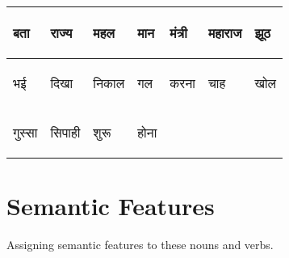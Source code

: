 \documentclass{article}
\begin{document}
\begin{table}[h]
\begin{tabular}{|l|l|l|l|l|l|l|}
\begin{hindi} बता \end{hindi} & \begin{hindi} राज्य \end{hindi} & \begin{hindi} महल \end{hindi} & \begin{hindi} मान \end{hindi} & \begin{hindi} मंत्री \end{hindi} & \begin{hindi} महाराज \end{hindi} & \begin{hindi} झूठ \end{hindi} \\ \hline 
\begin{hindi} भई \end{hindi} & \begin{hindi} दिखा \end{hindi} & \begin{hindi} निकाल \end{hindi} & \begin{hindi} गल \end{hindi} & \begin{hindi} करना \end{hindi} & \begin{hindi} चाह \end{hindi} & \begin{hindi} खोल \end{hindi} \\ \hline 
\begin{hindi} गुस्सा \end{hindi} & \begin{hindi} सिपाही \end{hindi} & \begin{hindi} शुरू \end{hindi} & \begin{hindi} होना \end{hindi} & & & \\ \hline

\end{tabular}

\end{table}

\section{Semantic Features}
Assigning semantic features to these nouns and verbs.
\end{document}
